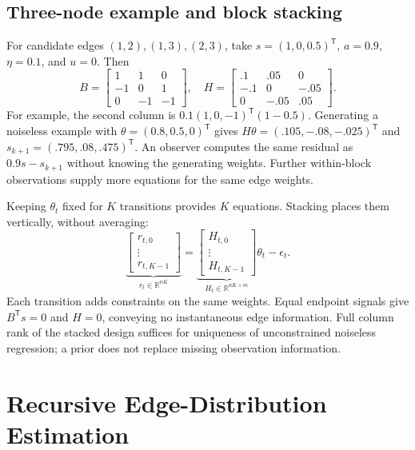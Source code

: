 \documentclass[journal]{IEEEtran}
\newcommand{\T}{\mathsf T}
\begin{document}
\subsection{Three-node example and block stacking}
For candidate edges $(1,2),(1,3),(2,3)$, take $s=(1,0,0.5)^\T$, $a=0.9$, $\eta=0.1$, and $u=0$. Then
\begin{equation}
B=\begin{bmatrix}1&1&0\\-1&0&1\\0&-1&-1\end{bmatrix},\quad
H=\begin{bmatrix}.1&.05&0\\-.1&0&-.05\\0&-.05&.05\end{bmatrix}.
\end{equation}
For example, the second column is $0.1(1,0,-1)^\T(1-0.5)$. Generating a noiseless example with $\theta=(0.8,0.5,0)^\T$ gives $H\theta=(.105,-.08,-.025)^\T$ and $s_{k+1}=(.795,.08,.475)^\T$. An observer computes the same residual as $0.9s-s_{k+1}$ without knowing the generating weights. Further within-block observations supply more equations for the same edge weights.

Keeping $\theta_t$ fixed for $K$ transitions provides $K$ equations. Stacking places them vertically, without averaging:
\begin{equation}
\underbrace{\begin{bmatrix}r_{t,0}\\\vdots\\r_{t,K-1}\end{bmatrix}}_{r_t\in\mathbb R^{nK}}
=\underbrace{\begin{bmatrix}H_{t,0}\\\vdots\\H_{t,K-1}\end{bmatrix}}_{H_t\in\mathbb R^{nK\times m}}\theta_t-\epsilon_t.\label{eq:stack}
\end{equation}
Each transition adds constraints on the same weights. Equal endpoint signals give $B^\T s=0$ and $H=0$, conveying no instantaneous edge information. Full column rank of the stacked design suffices for uniqueness of unconstrained noiseless regression; a prior does not replace missing observation information.

\section{Recursive Edge-Distribution Estimation}
\end{document}
